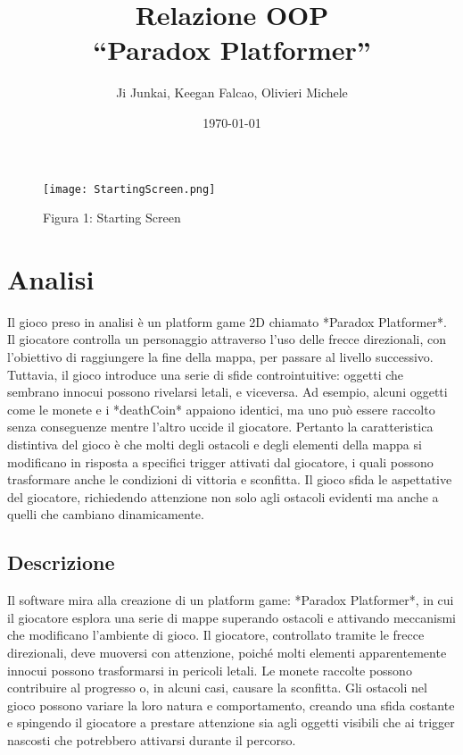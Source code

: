 \documentclass[a4paper,12pt]{report}
\title{Relazione OOP\\``Paradox Platformer''}
\author{Ji Junkai, Keegan Falcao, Olivieri Michele}
\date{\today}
\begin{document}
\maketitle

\tableofcontents

\begin{figure}[H]
    \centering
    \texttt{[image: StartingScreen.png]}
    \caption{Figura 1: Starting Screen}
\end{figure}

\chapter{Analisi}

Il gioco preso in analisi è un platform game 2D chiamato *Paradox Platformer*. Il giocatore controlla un personaggio attraverso l'uso delle frecce direzionali, con l'obiettivo di raggiungere la fine della mappa, per passare al livello successivo. Tuttavia, il gioco introduce una serie di sfide controintuitive: oggetti che sembrano innocui possono rivelarsi letali, e viceversa. Ad esempio, alcuni oggetti come le monete e i *deathCoin* appaiono identici, ma uno può essere raccolto senza conseguenze mentre l'altro uccide il giocatore. Pertanto la caratteristica distintiva del gioco è che molti degli ostacoli e degli elementi della mappa si modificano in risposta a specifici trigger attivati dal giocatore, i quali possono trasformare anche le condizioni di vittoria e sconfitta. Il gioco sfida le aspettative del giocatore, richiedendo attenzione non solo agli ostacoli evidenti ma anche a quelli che cambiano dinamicamente.

\section{Descrizione}

Il software mira alla creazione di un platform game: *Paradox Platformer*, in cui il giocatore esplora una serie di mappe superando ostacoli e attivando meccanismi che modificano l’ambiente di gioco. Il giocatore, controllato tramite le frecce direzionali, deve muoversi con attenzione, poiché molti elementi apparentemente innocui possono trasformarsi in pericoli letali. Le monete raccolte possono contribuire al progresso o, in alcuni casi, causare la sconfitta. Gli ostacoli nel gioco possono variare la loro natura e comportamento, creando una sfida costante e spingendo il giocatore a prestare attenzione sia agli oggetti visibili che ai trigger nascosti che potrebbero attivarsi durante il percorso.
\end{document}
